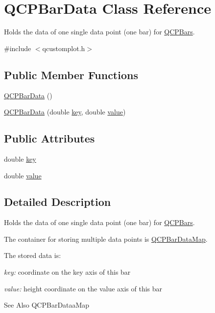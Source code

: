 \hypertarget{class_q_c_p_bar_data}{\section{Q\-C\-P\-Bar\-Data Class Reference}
\label{class_q_c_p_bar_data}
}


Holds the data of one single data point (one bar) for \hyperlink{class_q_c_p_bars}{Q\-C\-P\-Bars}.  




{\ttfamily \#include $<$qcustomplot.\-h$>$}

\subsection*{Public Member Functions}
\begin{DoxyCompactItemize}
\item 
\hyperlink{class_q_c_p_bar_data_a8d214eda9ef41bc6da2a908a09623836}{Q\-C\-P\-Bar\-Data} ()
\item 
\hyperlink{class_q_c_p_bar_data_ac0bb7ede5373a7b18713418fa78f972d}{Q\-C\-P\-Bar\-Data} (double \hyperlink{class_q_c_p_bar_data_afe544b035ef19027ea3d65adeaf81b42}{key}, double \hyperlink{class_q_c_p_bar_data_acab57005d8916d61b64e9ddef6113b60}{value})
\end{DoxyCompactItemize}
\subsection*{Public Attributes}
\begin{DoxyCompactItemize}
\item 
double \hyperlink{class_q_c_p_bar_data_afe544b035ef19027ea3d65adeaf81b42}{key}
\item 
double \hyperlink{class_q_c_p_bar_data_acab57005d8916d61b64e9ddef6113b60}{value}
\end{DoxyCompactItemize}


\subsection{Detailed Description}
Holds the data of one single data point (one bar) for \hyperlink{class_q_c_p_bars}{Q\-C\-P\-Bars}. 

The container for storing multiple data points is \hyperlink{qcustomplot_8h_aa846c77472cae93def9f1609d0c57191}{Q\-C\-P\-Bar\-Data\-Map}.

The stored data is\-: \begin{DoxyItemize}
\item {\itshape key\-:} coordinate on the key axis of this bar \item {\itshape value\-:} height coordinate on the value axis of this bar\end{DoxyItemize}
\begin{DoxySeeAlso}{See Also}
Q\-C\-P\-Bar\-Dataa\-Map 
\end{DoxySeeAlso}


